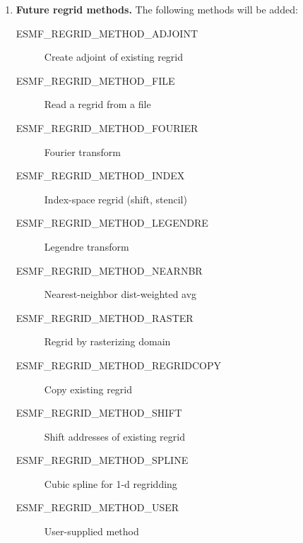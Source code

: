 \begin{enumerate}
\item {\bf Future regrid methods.}  The following methods will
be added:
 \begin{description}
   \item [ESMF\_REGRID\_METHOD\_ADJOINT]
         Create adjoint of existing regrid
   \item [ESMF\_REGRID\_METHOD\_FILE]
         Read a regrid from a file
   \item [ESMF\_REGRID\_METHOD\_FOURIER]
         Fourier transform
   \item [ESMF\_REGRID\_METHOD\_INDEX]
         Index-space regrid (shift, stencil)
   \item [ESMF\_REGRID\_METHOD\_LEGENDRE]
         Legendre transform
   \item [ESMF\_REGRID\_METHOD\_NEARNBR]
         Nearest-neighbor dist-weighted avg
   \item [ESMF\_REGRID\_METHOD\_RASTER]
         Regrid by rasterizing domain
   \item [ESMF\_REGRID\_METHOD\_REGRIDCOPY]
         Copy existing regrid
   \item [ESMF\_REGRID\_METHOD\_SHIFT]
         Shift addresses of existing regrid
   \item [ESMF\_REGRID\_METHOD\_SPLINE]
         Cubic spline for 1-d regridding
   \item [ESMF\_REGRID\_METHOD\_USER]
         User-supplied method
  \end{description}

\end{enumerate}


